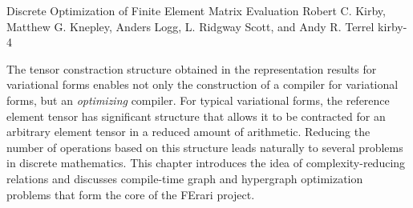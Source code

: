               {Discrete Optimization of Finite Element Matrix Evaluation}
              {Robert C. Kirby, Matthew G. Knepley, Anders Logg, L. Ridgway Scott, and Andy R. Terrel}
              {kirby-4}

The tensor constraction structure obtained in the representation
results for variational forms enables not only the construction of a
compiler for variational forms, but an \emph{optimizing} compiler.
For typical variational forms, the reference element tensor has
significant structure that allows it to be contracted for an arbitrary
element tensor in a reduced amount of arithmetic.  Reducing the number
of operations based on this structure leads naturally to several
problems in discrete mathematics.  This chapter introduces the idea of
complexity-reducing relations and discusses compile-time graph and
hypergraph optimization problems that form the core of the FErari
project.
